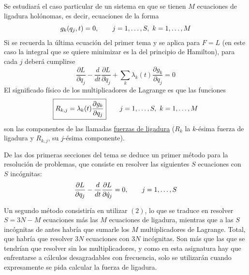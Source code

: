 \documentclass[12pt]{report}
\begin{document}
Se estudiará el caso particular de un sistema en que se tienen $M$ ecuaciones de ligadura holónomas, es decir, ecuaciones de la forma
\[g_k(q_j,t) = 0, \qquad j = 1,\mathellipsis,S, \ k = 1,\mathellipsis,M\]
Si se recuerda la última ecuación del primer tema y se aplica para $F = L$ (en este caso la integral que se quiere minimizar es la del principio de Hamilton), para cada $j$ deberá cumplirse
\[\frac{\partial L}{\partial q_j} - \frac{d}{dt}\frac{\partial L}{\partial \dot{q}_j} + \sum_k\lambda_k(t)\frac{\partial g_k}{\partial q_j} = 0 \tag{2}\]
El significado físico de los multiplicadores de Lagrange es que las funciones
\[\boxed{R_{k,j} = \lambda_k(t) \frac{\partial g_k}{\partial q_j}} \qquad j = 1,\mathellipsis,S, \ k = 1,\mathellipsis,M\]
son las componentes de las llamadas \ul{fuerzas de ligadura} ($R_k$ la $k$-ésima fuerza de ligadura y $R_{k,j}$, su $j$-ésima componente).

\vspace{2mm}
De las dos primeras secciones del tema se deduce un primer método para la resolución de problemas, que consiste en resolver las siguientes $S$ ecuaciones con $S$ incógnitas:
\[\frac{\partial L}{\partial q_j} -\frac{d}{dt}\frac{\partial L}{\partial \dot{q}_j} = 0, \qquad j = 1,\mathellipsis, S\]

Un segundo método consistiría en utilizar $(2)$, lo que se traduce en resolver $S = 3N-M$ ecuaciones más las $M$ ecuaciones de ligadura, mientras que a las $S$ incógnitas de antes habría que sumarle los $M$ multiplicadores de Lagrange. Total, que habría que resolver $3N$ ecuaciones con $3N$ incógnitas. Son más que las que se tendrían que resolver sin los multiplicadores, y como en esta asignatura hay que enfrentarse a cálculos desagradables con frecuencia, solo se utilizarán cuando expresamente se pida calcular la fuerza de ligadura.
\end{document}
